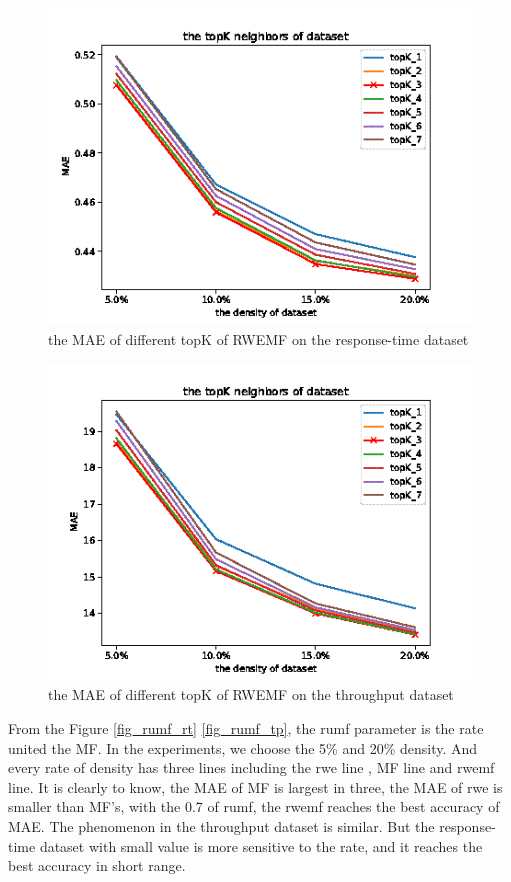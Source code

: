 \documentclass[conference]{IEEEtran}
\begin{document}
\begin{figure}[H]  
\centering  
\includegraphics[width=0.45\paperwidth]{topk_rt.png}  
\caption{the MAE of different topK of RWEMF on the response-time dataset }  
\label{fig_rt}  
\end{figure} 

\begin{figure}[H] 
\centering  
\includegraphics[width=0.45\paperwidth]{topk_tp.png}  
\caption{the MAE of different topK of RWEMF on the throughput dataset }  
\label{fig_tp}  
\end{figure} 



\par From the Figure \ref{fig_rumf_rt} \ref{fig_rumf_tp}, the rumf parameter is the rate united the MF. In the experiments, we choose the 5\% and 20\% density. And every rate of density has three lines including the rwe line , MF line and rwemf line. It is clearly to know, the MAE of MF is largest in three, the MAE of rwe is smaller than MF's, with the 0.7 of rumf, the rwemf reaches the best accuracy of MAE. The phenomenon in the throughput dataset is similar. But the response-time dataset with small value is more sensitive to the rate, and it reaches the best accuracy in short range. 
\end{document}
